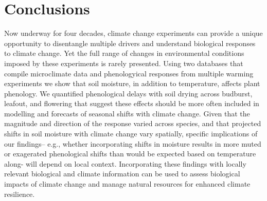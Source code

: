 \documentclass{article}
\begin{document}
\section* {Conclusions}
Now underway for four decades, climate change experiments \citep[e.g.,][]{tamaki1981,carlson1982,melillo2017} can provide a unique opportunity to disentangle multiple drivers and understand biological responses to climate change. Yet the full range of changes in environmental conditions imposed by these experiments is rarely presented. Using two databases that compile microclimate data and phenologyical responses from multiple warming experiments we show that soil moisture, in addition to temperature, affects plant phenology. We quantified phenological delays with soil drying across budburst, leafout, and flowering that suggest these effects should be more often included in modelling and forecasts of seasonal shifts with climate change. Given that the magnitude and direction of the response varied across species, and that projected shifts in soil moisture with climate change vary spatially, specific implications of our findings-- e.g., whether incorporating shifts in moisture results in more muted or exagerated phenological shifts than would be expected based on temperature along- will depend on local context. Incorporating these findings with locally relevant biological and climate information can be used to assess biological impacts of climate change and manage natural resources for enhanced climate resilience.

\end{document}
